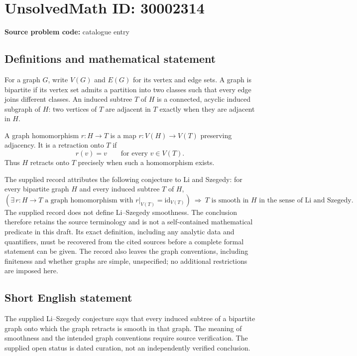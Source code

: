 \documentclass[11pt]{article}
\begin{document}
\section*{UnsolvedMath ID: 30002314}
\textbf{Source problem code:} catalogue entry
\subsection{Definitions and mathematical statement}
For a graph \(G\), write \(V(G)\) and \(E(G)\) for its vertex and edge sets. A graph is bipartite if its vertex set admits a partition into two classes such that every edge joins different classes. An induced subtree \(T\) of \(H\) is a connected, acyclic induced subgraph of \(H\): two vertices of \(T\) are adjacent in \(T\) exactly when they are adjacent in \(H\).

A graph homomorphism \(r:H\to T\) is a map \(r:V(H)\to V(T)\) preserving adjacency. It is a retraction onto \(T\) if
\[
 r(v)=v\qquad\text{for every }v\in V(T).
\]
Thus \(H\) retracts onto \(T\) precisely when such a homomorphism exists.

The supplied record attributes the following conjecture to Li and Szegedy: for every bipartite graph \(H\) and every induced subtree \(T\) of \(H\),
\[
 \left(\exists\,r:H\to T\text{ a graph homomorphism with }r|_{V(T)}=\mathrm{id}_{V(T)}\right)
 \ \Longrightarrow\ 
 T\text{ is smooth in }H\text{ in the sense of Li and Szegedy}.
\]
The supplied record does not define Li--Szegedy smoothness. The conclusion therefore retains the source terminology and is not a self-contained mathematical predicate in this draft. Its exact definition, including any analytic data and quantifiers, must be recovered from the cited sources before a complete formal statement can be given. The record also leaves the graph conventions, including finiteness and whether graphs are simple, unspecified; no additional restrictions are imposed here.
\subsection{Short English statement}
The supplied Li--Szegedy conjecture says that every induced subtree of a bipartite graph onto which the graph retracts is smooth in that graph. The meaning of smoothness and the intended graph conventions require source verification. The supplied open status is dated curation, not an independently verified conclusion.
\end{document}
